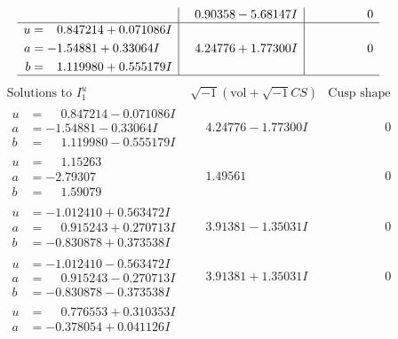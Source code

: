 \documentclass[1p]{elsarticle_modified}
\theoremstyle{definition}
\newcommand{\I}{\sqrt{-1}}
\begin{document}
$$\begin{array}{c|c|c}
 & \phantom{-}0.90358 - 5.68147 I & \phantom{-0.000000 } 0 \\ \hline\begin{aligned}
u &= \phantom{-}0.847214 + 0.071086 I \\
a &= -1.54881 + 0.33064 I \\
b &= \phantom{-}1.119980 + 0.555179 I\end{aligned}
 & \phantom{-}4.24776 + 1.77300 I & \phantom{-0.000000 } 0\\
 \hline 
 \end{array}$$\newpage$$\begin{array}{c|c|c}  
\text{Solutions to }I^u_{1}& \I (\text{vol} + \sqrt{-1}CS) & \text{Cusp shape}\\
 \hline 
\begin{aligned}
u &= \phantom{-}0.847214 - 0.071086 I \\
a &= -1.54881 - 0.33064 I \\
b &= \phantom{-}1.119980 - 0.555179 I\end{aligned}
 & \phantom{-}4.24776 - 1.77300 I & \phantom{-0.000000 } 0 \\ \hline\begin{aligned}
u &= \phantom{-}1.15263\phantom{ +0.000000I} \\
a &= -2.79307\phantom{ +0.000000I} \\
b &= \phantom{-}1.59079\phantom{ +0.000000I}\end{aligned}
 & \phantom{-}1.49561\phantom{ +0.000000I} & \phantom{-0.000000 } 0 \\ \hline\begin{aligned}
u &= -1.012410 + 0.563472 I \\
a &= \phantom{-}0.915243 + 0.270713 I \\
b &= -0.830878 + 0.373538 I\end{aligned}
 & \phantom{-}3.91381 - 1.35031 I & \phantom{-0.000000 } 0 \\ \hline\begin{aligned}
u &= -1.012410 - 0.563472 I \\
a &= \phantom{-}0.915243 - 0.270713 I \\
b &= -0.830878 - 0.373538 I\end{aligned}
 & \phantom{-}3.91381 + 1.35031 I & \phantom{-0.000000 } 0 \\ \hline\begin{aligned}
u &= \phantom{-}0.776553 + 0.310353 I \\
a &= -0.378054 + 0.041126 I \\

\end{aligned}
\end{array}$$
\end{document}

